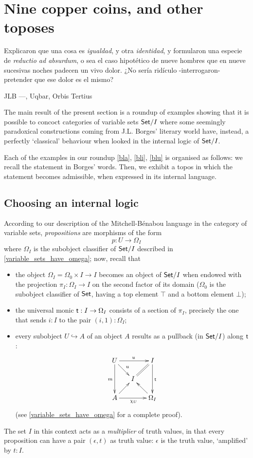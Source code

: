 \section{Nine copper coins, and other toposes}\label{sec_coins}
\epigraph{
  Explicaron que una cosa es \emph{igualdad}, y otra \emph{identidad}, y formularon una especie de \emph{reductio ad absurdum}, o sea el caso hipotético de nueve hombres que en nueve sucesivas noches padecen un vivo dolor. ¿No sería ridículo -interrogaron- pretender que ese dolor es el mismo?
}{JLB ---\tlon, Uqbar, Orbis Tertius}
The main result of the present section is a roundup of examples showing that it is possible to concoct categories of variable sets $\mathsf{Set}/I$ where some seemingly paradoxical constructions coming from J.L. Borges' literary world have, instead, a perfectly `classical' behaviour when looked in the internal logic of $\mathsf{Set}/I$.

Each of the examples in our roundup \autoref{bla}, \ref{bli}, \ref{blu} is organised as follows: we recall the statement in Borges' words. Then, we exhibit a topos in which the statement becomes admissible, when expressed in its internal language.
\subsection{Choosing an internal logic}
According to our description of the Mitchell-Bénabou language in the category of variable sets, \emph{propositions} are morphisms of the form
\[p : U \to \Omega_I\]
where $\Omega_I$ is the subobject classifier of $\mathsf{Set}/I$ described in \autoref{variable_sets_have_omega}; now, recall that
\begin{itemize}
  \item the object $\Omega_I = \Omega_0\times I \to I$ becomes an object of $\mathsf{Set}/I$ when endowed with the projection $\pi_I : \Omega_I \to I$ on the second factor of its domain ($\Omega_0$ is the subobject classifier of $\mathsf{Set}$, having a top element $\top$ and a bottom element $\bot$);
  \item the universal monic $\textsf{t} : I \to \Omega_I$ consists of a section of $\pi_I$, precisely the one that sends $i : I$ to the pair $(i,1) : \Omega_I$;
  \item every subobject $U \hookrightarrow A$ of an object $A$ results as a pullback (in $\mathsf{Set}/I$) along $\textsf{t}$:
        \[\xymatrix@R=5mm@C=5mm{
          U\ar[dr]^u\ar[rr]^u\ar[dd]_m&& I\ar[dd]^{\tr} \ar@{=}[dl]\\
          &I& \\
          A \ar[ur]\ar[rr]_{\chi_U}&& \ar[ul]\Omega_I
          }\]
        (see \autoref{variable_sets_have_omega} for a complete proof).
\end{itemize}
The set $I$ in this context acts as a \emph{multiplier} of truth values, in that every proposition can have a pair $(\epsilon, t)$ as truth value: $\epsilon$ is the truth value, `amplified' by $t : I$. 

